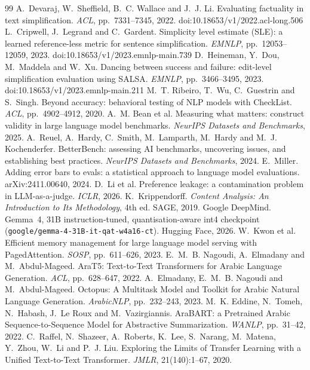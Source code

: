 \documentclass[10pt,a4paper]{article}
\begin{document}
\begin{thebibliography}{99}
 A.~Devaraj, W.~Sheffield, B.~C. Wallace and J.~J. Li. Evaluating factuality in text simplification. \emph{ACL}, pp.~7331--7345, 2022. doi:10.18653/v1/2022.acl-long.506
 L.~Cripwell, J.~Legrand and C.~Gardent. Simplicity level estimate (SLE): a learned reference-less metric for sentence simplification. \emph{EMNLP}, pp.~12053--12059, 2023. doi:10.18653/v1/2023.emnlp-main.739
 D.~Heineman, Y.~Dou, M.~Maddela and W.~Xu. Dancing between success and failure: edit-level simplification evaluation using SALSA. \emph{EMNLP}, pp.~3466--3495, 2023. doi:10.18653/v1/2023.emnlp-main.211
 M.~T. Ribeiro, T.~Wu, C.~Guestrin and S.~Singh. Beyond accuracy: behavioral testing of NLP models with CheckList. \emph{ACL}, pp.~4902--4912, 2020.
 A.~M. Bean et al. Measuring what matters: construct validity in large language model benchmarks. \emph{NeurIPS Datasets and Benchmarks}, 2025.
 A.~Reuel, A.~Hardy, C.~Smith, M.~Lamparth, M.~Hardy and M.~J. Kochenderfer. BetterBench: assessing AI benchmarks, uncovering issues, and establishing best practices. \emph{NeurIPS Datasets and Benchmarks}, 2024.
 E.~Miller. Adding error bars to evals: a statistical approach to language model evaluations. arXiv:2411.00640, 2024.
 D.~Li et al. Preference leakage: a contamination problem in LLM-as-a-judge. \emph{ICLR}, 2026.
 K.~Krippendorff. \emph{Content Analysis: An Introduction to Its Methodology}, 4th ed. SAGE, 2019.
 Google DeepMind. Gemma~4, 31B instruction-tuned, quantisation-aware int4 checkpoint (\texttt{google/gemma-4-31B-it-qat-w4a16-ct}). Hugging Face, 2026.
 W.~Kwon et al. Efficient memory management for large language model serving with PagedAttention. \emph{SOSP}, pp.~611--626, 2023.
 E.~M.~B. Nagoudi, A.~Elmadany and M.~Abdul-Mageed. AraT5: Text-to-Text Transformers for Arabic Language Generation. \emph{ACL}, pp.~628--647, 2022.
 A.~Elmadany, E.~M.~B. Nagoudi and M.~Abdul-Mageed. Octopus: A Multitask Model and Toolkit for Arabic Natural Language Generation. \emph{ArabicNLP}, pp.~232--243, 2023.
 M.~K. Eddine, N.~Tomeh, N.~Habash, J.~Le Roux and M.~Vazirgiannis. AraBART: a Pretrained Arabic Sequence-to-Sequence Model for Abstractive Summarization. \emph{WANLP}, pp.~31--42, 2022.
 C.~Raffel, N.~Shazeer, A.~Roberts, K.~Lee, S.~Narang, M.~Matena, Y.~Zhou, W.~Li and P.~J. Liu. Exploring the Limits of Transfer Learning with a Unified Text-to-Text Transformer. \emph{JMLR}, 21(140):1--67, 2020.

\end{thebibliography}
\end{document}
